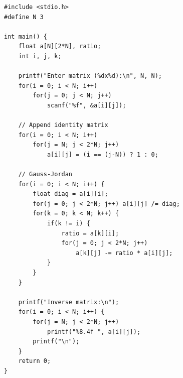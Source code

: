 \begin{verbatim}
#include <stdio.h>
#define N 3

int main() {
    float a[N][2*N], ratio;
    int i, j, k;

    printf("Enter matrix (%dx%d):\n", N, N);
    for(i = 0; i < N; i++)
        for(j = 0; j < N; j++)
            scanf("%f", &a[i][j]);

    // Append identity matrix
    for(i = 0; i < N; i++)
        for(j = N; j < 2*N; j++)
            a[i][j] = (i == (j-N)) ? 1 : 0;

    // Gauss-Jordan
    for(i = 0; i < N; i++) {
        float diag = a[i][i];
        for(j = 0; j < 2*N; j++) a[i][j] /= diag;
        for(k = 0; k < N; k++) {
            if(k != i) {
                ratio = a[k][i];
                for(j = 0; j < 2*N; j++)
                    a[k][j] -= ratio * a[i][j];
            }
        }
    }

    printf("Inverse matrix:\n");
    for(i = 0; i < N; i++) {
        for(j = N; j < 2*N; j++)
            printf("%8.4f ", a[i][j]);
        printf("\n");
    }
    return 0;
}

\end{verbatim}